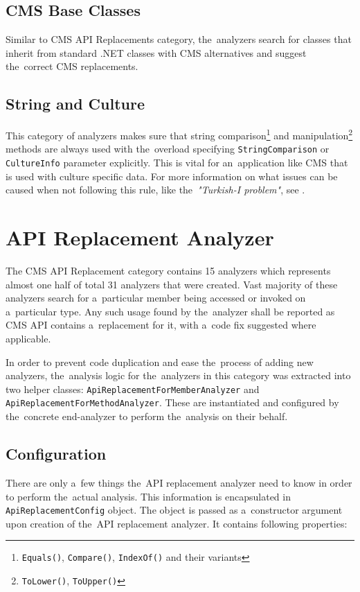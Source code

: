 \documentclass[
  digital, %
  table,   %
  lof,     %
  lot,     %
  oneside,
]{fithesis3}
\begin{document}
\subsection{CMS Base Classes}
Similar to CMS API Replacements category, the~analyzers search for classes that inherit from standard .NET classes with CMS alternatives and suggest the~correct CMS replacements.

\subsection{String and Culture}
This category of analyzers makes sure that string comparison\footnote{\texttt{Equals()}, \texttt{Compare()}, \texttt{IndexOf()} and their variants} and manipulation\footnote{\texttt{ToLower()}, \texttt{ToUpper()}} methods are always used with the~overload specifying \texttt{StringComparison} or \texttt{CultureInfo} parameter explicitly. This is vital for an~application like CMS that is used with culture specific data. For more information on what issues can be caused when not following this rule, like the~\textit{"Turkish-I problem"}, see \cite{best-practices-for-using-strings-in-dot-net}. 

\section{API Replacement Analyzer}
The CMS API Replacement category contains 15 analyzers which represents almost one half of total 31 analyzers that were created. Vast majority of these analyzers search for a~particular member being accessed or invoked on a~particular type. Any such usage found by the~analyzer shall be reported as CMS API contains a~replacement for it, with a~code fix suggested where applicable.

In order to prevent code duplication and ease the~process of adding new analyzers, the~analysis logic for the~analyzers in this category was extracted into two helper classes: \texttt{ApiReplacementForMemberAnalyzer} and \texttt{ApiReplacementForMethodAnalyzer}. These are instantiated and configured by the~concrete end-analyzer to perform the~analysis on their behalf.

\subsection{Configuration}
There are only a~few things the~API replacement analyzer need to know in order to perform the~actual analysis. This information is encapsulated in \texttt{ApiReplacementConfig} object. The object is passed as a~constructor argument upon creation of the~API replacement analyzer. It contains following properties:
\end{document}
